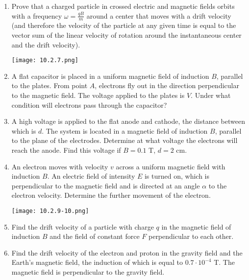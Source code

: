 \documentclass{article}
\begin{document}
\begin{enumerate}[label=10.2.\arabic*]
\item Prove that a charged particle in crossed electric and magnetic fields orbits with a frequency $\omega = \frac{qB}{m}$ around a center that moves with a drift velocity (and therefore the velocity of the particle at any given time is equal to the vector sum of the linear velocity of rotation around the instantaneous center and the drift velocity).

\begin{center}
    \texttt{[image: 10.2.7.png]}
\end{center}


\item A flat capacitor is placed in a uniform magnetic field of induction $B$, parallel to the plates. From point $A$, electrons fly out in the direction perpendicular to the magnetic field. The voltage applied to the plates is $V$. Under what condition will electrons pass through the capacitor?

\item A high voltage is applied to the flat anode and cathode, the distance between which is $d$. The system is located in a magnetic field of induction $B$, parallel to the plane of the electrodes. Determine at what voltage the electrons will reach the anode. Find this voltage if $B = 0.1$ T, $d = 2$ cm.

\item An electron moves with velocity $v$ across a uniform magnetic field with induction $B$. An electric field of intensity $E$ is turned on, which is perpendicular to the magnetic field and is directed at an angle $\alpha$ to the electron velocity. Determine the further movement of the electron.

\begin{center}
    \texttt{[image: 10.2.9-10.png]}
\end{center}


\item Find the drift velocity of a particle with charge $q$ in the magnetic field of induction $B$ and the field of constant force $F$ perpendicular to each other.

\item Find the drift velocity of the electron and proton in the gravity field and the Earth's magnetic field, the induction of which is equal to $0.7 \cdot 10^{-4}$ T. The magnetic field is perpendicular to the gravity field.


\end{enumerate}
\end{document}
